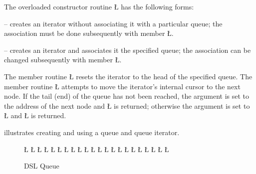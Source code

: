 \documentclass[openright,twoside]{report}
\begin{document}
The overloaded constructor routine \LGinlinetrue\LGbegin\lgrinde\L{}\endlgrinde\LGend{} has the following forms:
\begin{prefix}
\item[\LGinlinetrue\LGbegin\lgrinde\L{\LB{\V{uQueueIter}()}}\endlgrinde\LGend{}]
-- creates an iterator without associating it with a particular queue;
the association must be done subsequently with member \LGinlinetrue\LGbegin\lgrinde\L{}\endlgrinde\LGend{}.

\item[\LGinlinetrue\LGbegin\lgrinde\L{\LB{\V{uQueueIter}(\0\K{const}\0\V{uQueue}\<\V{T}\>\0\&\V{q}\0)}}\endlgrinde\LGend{}]
-- creates an iterator and associates it the specified queue;
the association can be changed subsequently with member \LGinlinetrue\LGbegin\lgrinde\L{}\endlgrinde\LGend{}.
\end{prefix}

The member routine \LGinlinetrue\LGbegin\lgrinde\L{}\endlgrinde\LGend{} resets the iterator to the head of the specified queue.
The member routine \LGinlinetrue\LGbegin\lgrinde\L{\LB{\>\>}}\endlgrinde\LGend{} attempts to move the iterator's internal cursor to the next node.
If the tail (end) of the queue has not been reached, the argument is set to the address of the next node and \LGinlinetrue\LGbegin\lgrinde\L{}\endlgrinde\LGend{} is returned;
otherwise the argument is set to \LGinlinetrue\LGbegin\lgrinde\L{}\endlgrinde\LGend{} and \LGinlinetrue\LGbegin\lgrinde\L{}\endlgrinde\LGend{} is returned.

 illustrates creating and using a queue and queue iterator.

\begin{figure}
\LGinlinefalse\LGbegin\lgrinde
\L{}
\L{\LB{}}
\L{\LB{}}
\L{\LB{\};}}
\L{}
\L{\LB{}}
\L{\LB{}}
\L{\LB{}}
\L{\LB{}}
\L{\LB{}}
\L{\LB{}}
\CE{}\L{\LB{}}
\L{\LB{}}
\L{\LB{}}
\CE{}\L{\LB{}}
\L{\LB{}}
\L{\LB{}}
\L{\LB{}}
\CE{}\L{\LB{}}
\L{\LB{}}
\L{\LB{}}
\L{\LB{\}}}
\endlgrinde\LGend
\caption{DSL Queue}
\label{f:DSLQueue}
\end{figure}
\end{document}
